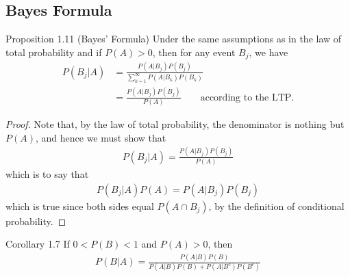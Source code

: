 \subsection{Bayes Formula}
\begin{boks}{Proposition 1.11 (Bayes' Formula)}
Under the same assumptions as in the law of total probability and if $P(A) > 0$, then for any event $B_j$, we have
\begin{align*}
    P(B_j|A) &= \frac{P(A|B_j)P(B_j)}{\sum_{k=1}^\infty P(A|B_k)P(B_k)} \\
    &= \frac{P(A|B_j)P(B_j)}{P(A)} \qquad \text{according to the LTP.}
\end{align*}
\end{boks}
\begin{proof}
  Note that, by the law of total probability, the denominator is nothing but $P(A)$, and hence we must show that
  \begin{align*}
    P(B_j|A) = \frac{P(A|B_j)P(B_j)}{P(A)}
  \end{align*}
  which is to say that
  \begin{align*}
    P(B_j|A)P(A) = P(A|B_j)P(B_j)
  \end{align*}
  which is true since both sides equal $P(A \cap B_j)$, by the definition of conditional probability.
\end{proof}

\begin{boks}{Corollary 1.7}
  If $0 < P(B) < 1$ and $P(A) > 0$, then
  \begin{align*}
    P(B|A) = \frac{P(A|B)P(B)}{P(A|B)P(B) + P(A|B^c)P(B^c)}
  \end{align*}
\end{boks}
